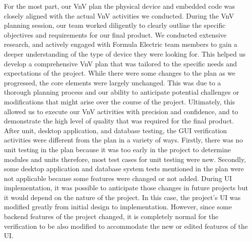 \documentclass[12pt, titlepage]{article}
\begin{document}
 For the most part, our VnV plan the physical device and embedded code was closely aligned with the actual VnV activities we conducted. During the VnV planning session, our team worked diligently to clearly outline the specific objectives and requirements for our final product. We conducted extensive research, and actively engaged with Formula Electric team members to gain a deeper understanding of the type of device they were looking for. This helped us develop a comprehensive VnV plan that was tailored to the specific needs and expectations of the project. While there were some changes to the plan as we progressed, the core elements were largely unchanged. This was due to a thorough planning process and our ability to anticipate potential challenges or modifications that might arise over the course of the project. Ultimately, this allowed us to execute our VnV activities with precision and confidence, and to demonstrate the high level of quality that was required for the final product. \\

  After unit, desktop application, and database testing, the GUI verification activities were different from the plan in a variety of ways. Firstly, there was no unit testing in the plan because it was too early in the project to determine modules and units therefore, most test cases for unit testing were new. Secondly, some desktop application and database system tests mentioned in the plan were not applicable because some features were changed or not added. During UI implementation, it was possible to anticipate those changes in future projects but it would depend on the nature of the project. In this case, the project's UI was modified greatly from initial design to implementation. However, since some backend features of the project changed, it is completely normal for the verification to be also modified to accommodate the new or edited features of the UI.
\end{document}
